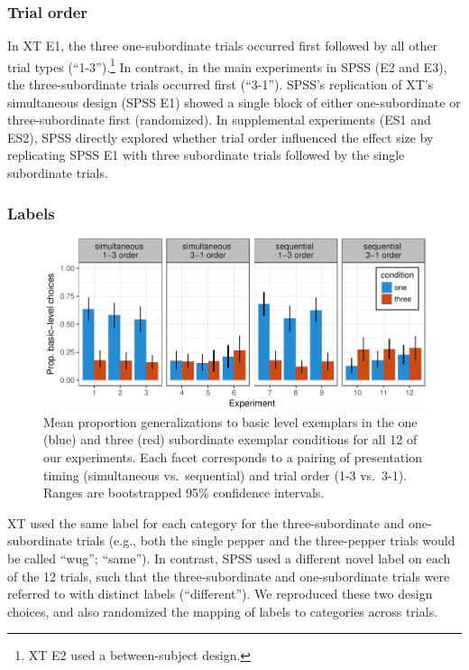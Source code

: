 \documentclass[english,floatsintext,man]{apa6}
\theoremstyle{definition}
\theoremstyle{definition}
\theoremstyle{definition}
\theoremstyle{remark}
\begin{document}
\subsubsection{Trial order}\label{trial-order}

In XT E1, the three one-subordinate trials occurred first followed by
all other trial types
(\enquote{1-3}).\footnote{XT E2 used a between-subject design.} In
contrast, in the main experiments in SPSS (E2 and E3), the
three-subordinate trials occurred first (\enquote{3-1}). SPSS's
replication of XT's simultaneous design (SPSS E1) showed a single block
of either one-subordinate or three-subordinate first (randomized). In
supplemental experiments (ES1 and ES2), SPSS directly explored whether
trial order influenced the effect size by replicating SPSS E1 with three
subordinate trials followed by the single subordinate trials.

\subsubsection{Labels}\label{labels}

\begin{figure}
\centering
\includegraphics{xtmem_files/figure-latex/unnamed-chunk-3-1.pdf}
\caption{\label{fig:unnamed-chunk-3}Mean proportion generalizations to basic
level exemplars in the one (blue) and three (red) subordinate exemplar
conditions for all 12 of our experiments. Each facet corresponds to a
pairing of presentation timing (simultaneous vs.~sequential) and trial
order (1-3 vs.~3-1). Ranges are bootstrapped 95\% confidence intervals.}
\end{figure}

XT used the same label for each category for the three-subordinate and
one-subordinate trials (e.g., both the single pepper and the
three-pepper trials would be called \enquote{wug}; \enquote{same}). In
contrast, SPSS used a different novel label on each of the 12 trials,
such that the three-subordinate and one-subordinate trials were referred
to with distinct labels (\enquote{different}). We reproduced these two
design choices, and also randomized the mapping of labels to categories
across trials.
\end{document}
